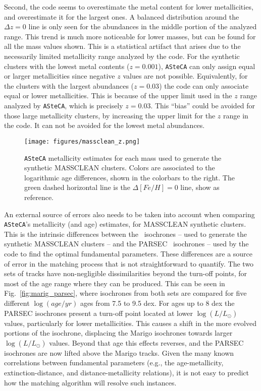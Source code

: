\documentclass{aa}
\begin{document}
\begin{appendix}
Second, the code seems to overestimate the metal content for lower
metallicities, and overestimate it for the largest ones.
A balanced distribution around the $\Delta z{=}0$ line is only seen for the
abundances in the middle portion of the analyzed range. This trend is much more
noticeable for lower masses, but can be found for all the mass values shown.
%
This is a statistical artifact that arises due to the necessarily limited
metallicity range analyzed by the code. For the synthetic clusters with the
lowest metal contents ($z{=}0.001$), \texttt{ASteCA} can only assign equal or
larger metallicities since negative $z$ values are not possible.
Equivalently, for the clusters with the largest abundances ($z{=}0.03$) the code
can only associate equal or lower metallicities. This is because of the upper
limit used in the $z$ range analyzed by \texttt{ASteCA}, which is precisely
$z{=}0.03$.
This ``bias'' could be avoided for those large metallicity clusters, by
increasing the upper limit for the $z$ range in the code. It can not be avoided
for the lowest metal abundances.\\

\begin{figure*}
\texttt{[image: figures/massclean\_z.png]}
\caption{\texttt{ASteCA} metallicity estimates for each mass used to generate
the synthetic MASSCLEAN clusters. Colors are associated to the logarithmic age
differences, shown in the colorbars to the right. The green dashed horizontal
line is the $\Delta[Fe/H]{=}0$ line, show as reference.}
\label{fig:massclean_z}
\end{figure*}

An external source of errors also needs to be taken into account when comparing
\texttt{ASteCA}'s metallicity (and age) estimates, for MASSCLEAN synthetic
clusters.
%
This is the intrinsic differences between the~\cite{Marigo_2008} isochrones --
used to generate the synthetic MASSCLEAN clusters -- and the
PARSEC~\citep{Bressan_2012} isochrones -- used by the code to find the optimal
fundamental parameters. These differences are a source of error in the matching
process that is not straightforward to quantify.
%
The two sets of tracks have non-negligible dissimilarities beyond the turn-off
points, for most of the age range where they can be produced. This can be seen
in Fig.~\ref{fig:marig_parsec}, where isochrones from both sets are compared for
five different $\log(age/yr)$ ages from 7.5 to 9.5 dex.
%
For ages up to 8 dex the PARSEC isochrones present a turn-off point located at
lower $\log(L/L_{\odot})$ values, particularly for lower metallicities. This
causes a shift in the more evolved portions of the isochrone, displacing the
Marigo isochrones towards larger $\log(L/L_{\odot})$ values.
%
Beyond that age this effects reverses, and the PARSEC isochrones are now lifted
above the Marigo tracks. Given the many known correlations between fundamental
parameters (e.g., the age-metallicity, extinction-distance, and
distance-metallicity relations), it is not easy to predict how the matching
algorithm will resolve such instances.


\end{appendix}
\end{document}
